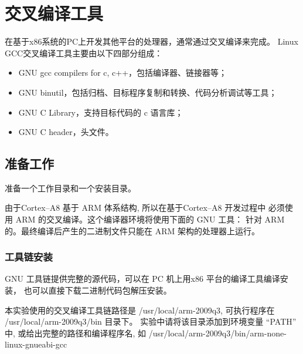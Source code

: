 \chapter{交叉编译工具}

  在基于x86系统的PC上开发其他平台的处理器，通常通过交叉编译来完成。
Linux GCC交叉编译工具主要由以下四部分组成：

\begin{itemize}\itemsep=-3pt
  \item GNU gcc compilers for c, c++，包括编译器、链接器等；
  \item GNU binutil，包括归档、目标程序复制和转换、代码分析调试等工具；
  \item GNU C Library，支持目标代码的 c 语言库；
  \item GNU C header，头文件。
\end{itemize}

\section{准备工作}
  准备一个工作目录和一个安装目录。

	由于Cortex--A8 基于 ARM 体系结构, 所以在基于Cortex--A8 开发过程中
必须使用 ARM 的交叉编译。这个编译器环境将使用下面的 GNU 工具：
针对 ARM 的。最终编译后产生的二进制文件只能在 ARM 架构的处理器上运行。

\subsection{工具链安装}
	GNU 工具链提供完整的源代码，可以在 PC 机上用x86 平台的编译工具编译安装，
也可以直接下载二进制代码包解压安装。

	本实验使用的交叉编译工具链路径是 /usr/local/arm-2009q3, 可执行程序在
 /usr/local/arm-2009q3/bin 目录下。 实验中请将该目录添加到环境变量 ``PATH''
中, 或给出完整的路径和编译程序名, 如
/usr/local/arm-2009q3/bin/arm-none-linux-gnueabi-gcc

